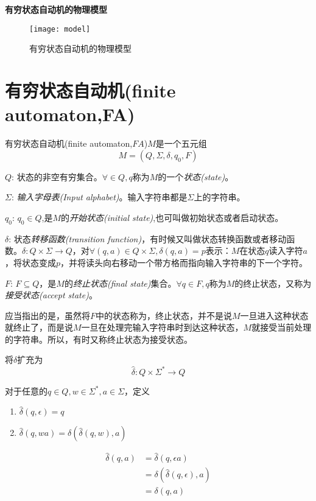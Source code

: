 \textbf{有穷状态自动机的物理模型}
\begin{figure}[htbp]
	\texttt{[image: model]}
	\caption{有穷状态自动机的物理模型}
	\label{fig:model}       %
\end{figure}

\section{有穷状态自动机(finite automaton,FA)}
\begin{definition}有穷状态自动机(finite automaton,$FA$)$M$是一个五元组
	\[M=(Q,\Sigma,\delta,q_0,F)\]
	
	$Q$: 状态的非空有穷集合。$\forall\in Q,q$称为$M$的一个\emph{状态(state)}。
	
	$\Sigma$: \emph{输入字母表(Input alphabet)}。输入字符串都是$\Sigma$上的字符串。
	
	$q_0$: $q_0\in Q$,是$M$的\emph{开始状态(initial state)},也可叫做初始状态或者启动状态。
	
	$\delta$: 状态\emph{转移函数(transition function)}，有时候又叫做状态转换函数或者移动函数。$\delta: Q\times\Sigma\to Q$，对$\forall(q,a)\in Q\times\Sigma,\delta(q,a)=p$表示：$M$在状态$q$读入字符$a$，将状态变成$p$，并将读头向右移动一个带方格而指向输入字符串的下一个字符。
	
	$F$: $F\subseteq Q$，是$M$的\emph{终止状态(final state)}集合。$\forall q\in F, q$称为$M$的终止状态，又称为\emph{接受状态(accept state)}。  
\end{definition}

\begin{note}
	应当指出的是，虽然将$F$中的状态称为，终止状态，并不是说$M$一旦进入这种状态就终止了，而是说$M$一旦在处理完输入字符串时到达这种状态，$M$就接受当前处理的字符串。所以，有时又称终止状态为接受状态。
\end{note}

将$\delta$扩充为
\[\hat{\delta}: Q\times\Sigma^{\ast}\to Q\]

对于任意的$q\in Q, w\in\Sigma^{\ast}, a\in\Sigma$，定义
\begin{enumerate}
	\item $\hat{\delta}(q,\epsilon) = q$
	\item $\hat{\delta}(q,wa) = \delta(\hat{\delta}(q,w),a)$
\end{enumerate}
\begin{align*}
 \hat{\delta}(q,a) &= \hat{\delta}(q,\epsilon a) \\
 				   &= \delta(\hat{\delta}(q,\epsilon),a) \\
 				   &= \delta(q,a)
\end{align*}

